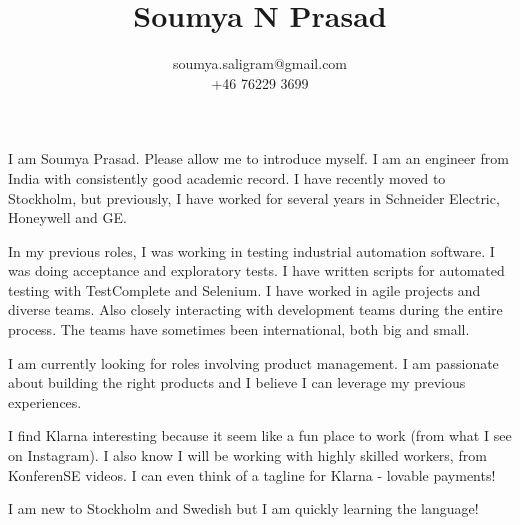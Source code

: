 \documentclass{article}
\begin{document}
\title{Soumya N Prasad}
\author{soumya.saligram@gmail.com \\
+46 76229 3699}
\date{\vspace{-5ex}}
\maketitle
\section*{}
I am Soumya Prasad. Please allow me to introduce myself.  
I am an engineer from India with consistently good academic record. 
I have recently moved to Stockholm, but previously, 
I have worked for several years in Schneider Electric, Honeywell and GE.

In my previous roles, I was working in testing industrial automation
software. I was doing acceptance and exploratory tests. I have written
scripts for automated testing with TestComplete and Selenium. I have
worked in agile projects and diverse teams. Also closely 
interacting with development teams during the entire process. The 
teams have sometimes been international, both big and small.

I am currently looking for roles involving product management. 
I am passionate about building the right products and I believe
I can leverage my previous experiences.

I find Klarna interesting because it seem like a fun place to work
(from what I see on Instagram).  I also know I will be working with
highly skilled workers, from KonferenSE videos.
I can even think of a tagline for Klarna - lovable payments!

I am new to Stockholm and Swedish but I am quickly learning the language!
\end{document}
